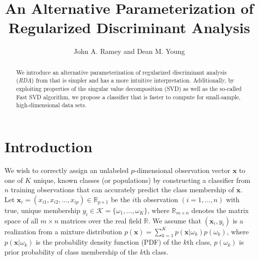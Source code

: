 \documentclass[11pt]{article}
\title{An Alternative Parameterization of Regularized Discriminant Analysis}
\author{John A. Ramey and Dean M. Young}
\begin{document}
\newtheorem*{thm}{Theorem}
\newtheorem*{cor}{Corollary}


\doublespacing

\maketitle



\begin{abstract}
We introduce an alternative parameterization of regularized discriminant analysis (\emph{RDA}) from \cite{Friedman:1989tm} that is simpler and has a more intuitive interpretation. Additionally, by exploiting properties of the singular value decomposition (SVD) as well as the so-called Fast SVD algorithm, we propose a classifier that is faster to compute for small-sample, high-dimensional data sets.
\end{abstract}

\section{Introduction}

We wish to correctly assign an unlabeled $p$-dimensional observation vector $\bm x$ to one of $K$ unique, known classes (or populations) by constructing a classifier from $n$ training observations that can accurately predict the class membership of $\bm x$. Let $\bm x_i = (x_{i1}, x_{i2}, \ldots, x_{ip}) \in \mathbb{R}_{p \times 1}$ be the $i$th observation $(i = 1, \ldots, n)$ with true, unique membership $y_i \in \mathcal{K} = \{\omega_1, \ldots, \omega_K\}$, where $\mathbb{R}_{m \times n}$ denotes the matrix space of all $m \times n$ matrices over the real field $\mathbb{R}$. We assume that $(\bm x_i, y_i)$ is a realization from a mixture distribution $p(\bm x) = \sum_{k=1}^K p(\bm x | \omega_k) p(\omega_k)$, where $p(\bm x | \omega_k)$ is the probability density function (PDF) of the $k$th class, $p(\omega_k)$ is prior probability of class membership of the $k$th class.
\end{document}
